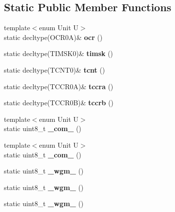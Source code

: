 \subsection*{Static Public Member Functions}
\begin{DoxyCompactItemize}
\item 
{\footnotesize template$<$enum Unit U$>$ }\\static decltype(O\+C\+R0A)\& {\bfseries ocr} ()\hypertarget{struct__timer_1_1Timer0_ad16cd0120c36c36004d17e028818c593}{}\label{struct__timer_1_1Timer0_ad16cd0120c36c36004d17e028818c593}

\item 
static decltype(T\+I\+M\+S\+K0)\& {\bfseries timsk} ()\hypertarget{struct__timer_1_1Timer0_a6f5e3922897bf39dd7aab85a80b134ea}{}\label{struct__timer_1_1Timer0_a6f5e3922897bf39dd7aab85a80b134ea}

\item 
static decltype(T\+C\+N\+T0)\& {\bfseries tcnt} ()\hypertarget{struct__timer_1_1Timer0_a176eaf59c3fcc1324a94d3e984b7f888}{}\label{struct__timer_1_1Timer0_a176eaf59c3fcc1324a94d3e984b7f888}

\item 
static decltype(T\+C\+C\+R0A)\& {\bfseries tccra} ()\hypertarget{struct__timer_1_1Timer0_afa3bb72ce004ad71dfbbbe922eb09ce7}{}\label{struct__timer_1_1Timer0_afa3bb72ce004ad71dfbbbe922eb09ce7}

\item 
static decltype(T\+C\+C\+R0B)\& {\bfseries tccrb} ()\hypertarget{struct__timer_1_1Timer0_ad195062da01e2a664ec13f96b77b1060}{}\label{struct__timer_1_1Timer0_ad195062da01e2a664ec13f96b77b1060}

\item 
{\footnotesize template$<$enum Unit U$>$ }\\static uint8\+\_\+t {\bfseries \+\_\+com\+\_} ()\hypertarget{struct__timer_1_1Timer0_a7f9486e19779260a5c95847123b3e551}{}\label{struct__timer_1_1Timer0_a7f9486e19779260a5c95847123b3e551}

\item 
{\footnotesize template$<$enum Unit U$>$ }\\static uint8\+\_\+t {\bfseries \+\_\+com\+\_} ()\hypertarget{struct__timer_1_1Timer0_ab69def1d0b4d99d88c3a1d8889166d91}{}\label{struct__timer_1_1Timer0_ab69def1d0b4d99d88c3a1d8889166d91}

\item 
static uint8\+\_\+t {\bfseries \+\_\+wgm\+\_} ()\hypertarget{struct__timer_1_1Timer0_a379fca503406283d96ff5affb0ccfe84}{}\label{struct__timer_1_1Timer0_a379fca503406283d96ff5affb0ccfe84}

\item 
static uint8\+\_\+t {\bfseries \+\_\+wgm\+\_} ()\hypertarget{struct__timer_1_1Timer0_addf299a7c98854171c4a5256203924b0}{}\label{struct__timer_1_1Timer0_addf299a7c98854171c4a5256203924b0}

\item 
static uint8\+\_\+t {\bfseries \+\_\+wgm\+\_} ()\hypertarget{struct__timer_1_1Timer0_a49ffd95e7b493ca47fad2dd896c9ec7d}{}\label{struct__timer_1_1Timer0_a49ffd95e7b493ca47fad2dd896c9ec7d}

\end{DoxyCompactItemize}
